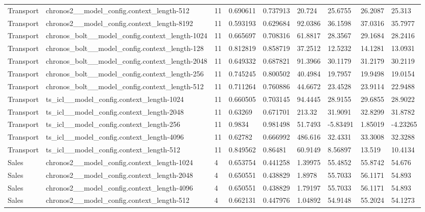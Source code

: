 \begin{tabular}{lllllllll}
Transport & chronos2\_\_model\_config.context\_length-512 & 11 & 0.690611 & 0.737913 & 20.724 & 25.6755 & 26.2087 & 25.313 \\
Transport & chronos2\_\_model\_config.context\_length-8192 & 11 & 0.593193 & 0.629684 & 92.0386 & 36.1598 & 37.0316 & 35.7977 \\
Transport & chronos\_bolt\_\_model\_config.context\_length-1024 & 11 & 0.665697 & 0.708316 & 61.8817 & 28.3567 & 29.1684 & 28.2416 \\
Transport & chronos\_bolt\_\_model\_config.context\_length-128 & 11 & 0.812819 & 0.858719 & 37.2512 & 12.5232 & 14.1281 & 13.0931 \\
Transport & chronos\_bolt\_\_model\_config.context\_length-2048 & 11 & 0.649332 & 0.687821 & 91.3966 & 30.1179 & 31.2179 & 30.2119 \\
Transport & chronos\_bolt\_\_model\_config.context\_length-256 & 11 & 0.745245 & 0.800502 & 40.4984 & 19.7957 & 19.9498 & 19.0154 \\
Transport & chronos\_bolt\_\_model\_config.context\_length-512 & 11 & 0.711264 & 0.760886 & 44.6672 & 23.4528 & 23.9114 & 22.9488 \\
Transport & ts\_icl\_\_model\_config.context\_length-1024 & 11 & 0.660505 & 0.703145 & 94.4445 & 28.9155 & 29.6855 & 28.9022 \\
Transport & ts\_icl\_\_model\_config.context\_length-2048 & 11 & 0.63269 & 0.671701 & 213.32 & 31.9091 & 32.8299 & 31.8782 \\
Transport & ts\_icl\_\_model\_config.context\_length-256 & 11 & 0.9834 & 0.981498 & 51.7493 & -5.83491 & 1.85019 & -4.23265 \\
Transport & ts\_icl\_\_model\_config.context\_length-4096 & 11 & 0.62782 & 0.666992 & 486.616 & 32.4331 & 33.3008 & 32.3288 \\
Transport & ts\_icl\_\_model\_config.context\_length-512 & 11 & 0.849562 & 0.86481 & 60.9149 & 8.56897 & 13.519 & 10.4134 \\
Sales & chronos2\_\_model\_config.context\_length-1024 & 4 & 0.653754 & 0.441258 & 1.39975 & 55.4852 & 55.8742 & 54.676 \\
Sales & chronos2\_\_model\_config.context\_length-2048 & 4 & 0.650551 & 0.438829 & 1.8978 & 55.7033 & 56.1171 & 54.893 \\
Sales & chronos2\_\_model\_config.context\_length-4096 & 4 & 0.650551 & 0.438829 & 1.79197 & 55.7033 & 56.1171 & 54.893 \\
Sales & chronos2\_\_model\_config.context\_length-512 & 4 & 0.662131 & 0.447976 & 1.04892 & 54.9148 & 55.2024 & 54.1273 \\

\end{tabular}
